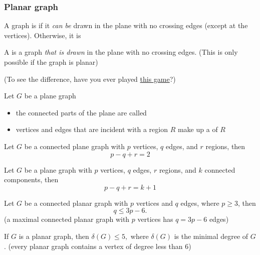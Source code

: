 \documentclass[aspectratio=169]{beamer}\usepackage[]{graphicx}\usepackage[]{xcolor}
\begin{document}
\begin{frame}\frametitle{Planar graph}
\begin{definition}
A graph is  if it \emph{can be} drawn in the plane with no crossing edges (except at the vertices). Otherwise, it is 
\end{definition}
\vfill
\begin{definition}
A  is a graph \emph{that is drawn} in the plane with no crossing edges. (This is only possible if the graph is planar)
\end{definition}
\vfill
(To see the difference, have you ever played \href{https://www.chiark.greenend.org.uk/~sgtatham/puzzles/js/untangle.html}{this game}?)
\end{frame}



\begin{frame}
Let $G$ be a plane graph
\begin{itemize}
\item the connected parts of the plane are called 
\item vertices and edges that are incident with a region $R$ make up a  of $R$
\end{itemize}
\vfill
\begin{theorem}
Let $G$ be a connected plane graph with $p$ vertices, $q$ edges, and $r$ regions, then $$p-q+r=2$$
\end{theorem}
\vfill
\begin{corollary}
Let $G$ be a plane graph with $p$ vertices, $q$ edges, $r$ regions, and $k$ connected components, then $$p-q+r=k+1$$
\end{corollary}
\end{frame}


\begin{frame}
\begin{theorem}
Let $G$ be a connected planar graph with $p$ vertices and $q$ edges, where $p\geq 3$, then $$q\leq 3p-6.$$
(a maximal connected planar graph with $p$ vertices has $q=3p-6$ edges)
\end{theorem}
\vfill
\begin{corollary}
If $G$ is a planar graph, then $\delta(G)\leq 5,$
where $\delta(G)$ is the minimal degree of $G$.
(every planar graph contains a vertex of degree less than 6)
\end{corollary}
\end{frame}
\end{document}
